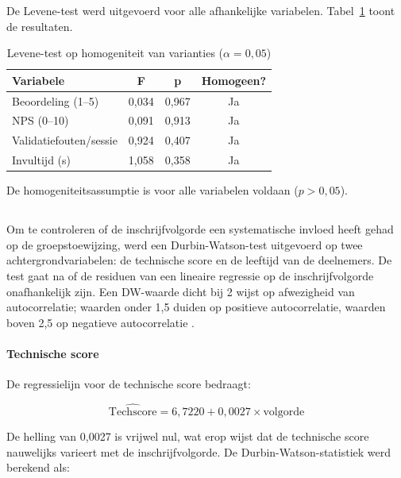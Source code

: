 De Levene-test werd uitgevoerd voor alle afhankelijke variabelen. Tabel~\ref{tab:levene} toont de resultaten.

\begin{table}[h]
  \centering
  \caption[Levene-test homogeniteit van varianties]{Levene-test op homogeniteit van varianties ($\alpha = 0{,}05$)}
  \label{tab:levene}
  \begin{tabular}{lccc}
    \hline
    \textbf{Variabele} & \textbf{F} & \textbf{p} & \textbf{Homogeen?} \\
    \hline
    Beoordeling (1–5)     & 0,034 & 0,967 & Ja \\
    NPS (0–10)            & 0,091 & 0,913 & Ja \\
    Validatiefouten/sessie & 0,924 & 0,407 & Ja \\
    Invultijd (s)         & 1,058 & 0,358 & Ja \\
    \hline
  \end{tabular}
\end{table}

De homogeniteitsassumptie is voor alle variabelen voldaan ($p > 0{,}05$).

\subsection{}

Om te controleren of de inschrijfvolgorde een systematische invloed heeft gehad op de groepstoewijzing, werd een Durbin-Watson-test uitgevoerd op twee achtergrondvariabelen: de technische score en de leeftijd van de deelnemers. De test gaat na of de residuen van een lineaire regressie op de inschrijfvolgorde onafhankelijk zijn. Een DW-waarde dicht bij 2 wijst op afwezigheid van autocorrelatie; waarden onder 1,5 duiden op positieve autocorrelatie, waarden boven 2,5 op negatieve autocorrelatie \autocite{Field2018}.

\paragraph{Technische score}

De regressielijn voor de technische score bedraagt:

\[
\widehat{\text{Techscore}} = 6{,}7220 + 0{,}0027 \times \text{volgorde}
\]

De helling van 0,0027 is vrijwel nul, wat erop wijst dat de technische score nauwelijks varieert met de inschrijfvolgorde. De Durbin-Watson-statistiek werd berekend als:

